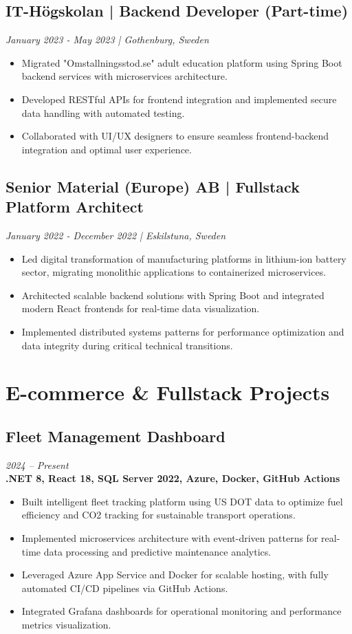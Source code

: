 \documentclass[10pt,a4paper]{article}
\begin{document}
\subsection*{IT-Högskolan | Backend Developer (Part-time)}
\textit{January 2023 - May 2023 | Gothenburg, Sweden}
\begin{itemize}[noitemsep]
\item Migrated "Omstallningsstod.se" adult education platform using Spring Boot backend services with microservices architecture.
\item Developed RESTful APIs for frontend integration and implemented secure data handling with automated testing.
\item Collaborated with UI/UX designers to ensure seamless frontend-backend integration and optimal user experience.
\end{itemize}

\subsection*{Senior Material (Europe) AB | Fullstack Platform Architect}
\textit{January 2022 - December 2022 | Eskilstuna, Sweden}
\begin{itemize}[noitemsep]
\item Led digital transformation of manufacturing platforms in lithium-ion battery sector, migrating monolithic applications to containerized microservices.
\item Architected scalable backend solutions with Spring Boot and integrated modern React frontends for real-time data visualization.
\item Implemented distributed systems patterns for performance optimization and data integrity during critical technical transitions.
\end{itemize}

\section*{E-commerce \& Fullstack Projects}

\subsection*{Fleet Management Dashboard}
\textit{2024 -- Present} \\
\textbf{.NET 8, React 18, SQL Server 2022, Azure, Docker, GitHub Actions}
\begin{itemize}[noitemsep]
\item Built intelligent fleet tracking platform using US DOT data to optimize fuel efficiency and CO2 tracking for sustainable transport operations.
\item Implemented microservices architecture with event-driven patterns for real-time data processing and predictive maintenance analytics.
\item Leveraged Azure App Service and Docker for scalable hosting, with fully automated CI/CD pipelines via GitHub Actions.
\item Integrated Grafana dashboards for operational monitoring and performance metrics visualization.
\end{itemize}
\end{document}
